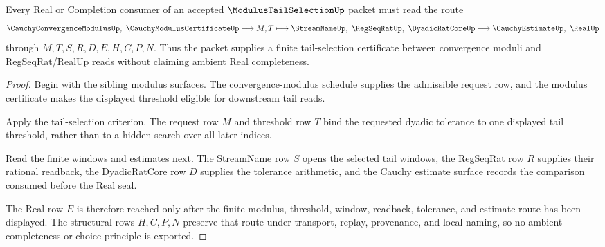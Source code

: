 \begin{theorem}
\label{thm:modulus-tail-selection-cauchy-handoff}
Every Real or Completion consumer of an accepted $\ModulusTailSelectionUp$ packet must read the route
$$
\CauchyConvergenceModulusUp,\ \CauchyModulusCertificateUp
\longmapsto
M,T
\longmapsto
\StreamNameUp,\ \RegSeqRatUp,\ \DyadicRatCoreUp
\longmapsto
\CauchyEstimateUp,\ \RealUp
$$
through $M,T,S,R,D,E,H,C,P,N$. Thus the packet supplies a finite tail-selection certificate between convergence moduli and RegSeqRat/RealUp reads without claiming ambient Real completeness.
\end{theorem}
\begin{proof}
Begin with the sibling modulus surfaces. The convergence-modulus schedule supplies the admissible request row, and the modulus certificate makes the displayed threshold eligible for downstream tail reads.

Apply the tail-selection criterion. The request row $M$ and threshold row $T$ bind the requested dyadic tolerance to one displayed tail threshold, rather than to a hidden search over all later indices.

Read the finite windows and estimates next. The StreamName row $S$ opens the selected tail windows, the RegSeqRat row $R$ supplies their rational readback, the DyadicRatCore row $D$ supplies the tolerance arithmetic, and the Cauchy estimate surface records the comparison consumed before the Real seal.

The Real row $E$ is therefore reached only after the finite modulus, threshold, window, readback, tolerance, and estimate route has been displayed. The structural rows $H,C,P,N$ preserve that route under transport, replay, provenance, and local naming, so no ambient completeness or choice principle is exported.
\end{proof}



